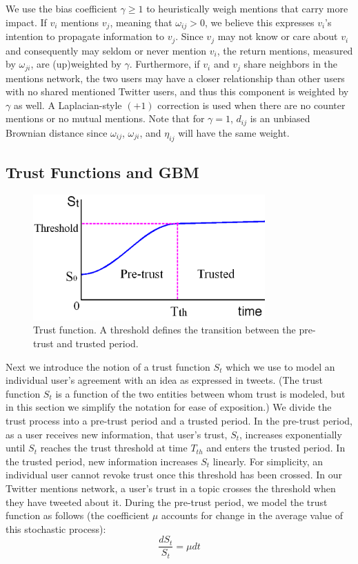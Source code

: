 We use the bias coefficient $\gamma \geq 1$ to heuristically
weigh mentions that carry more impact. If $v_i$ mentions $v_j$, meaning that $\omega_{ij} > 0$, we believe this expresses $v_i$'s intention to propagate information to $v_j$.
Since $v_j$ may not know or care about $v_i$ and consequently may seldom or never mention $v_i$, the return mentions, measured by $\omega_{ji}$, are (up)weighted by $\gamma$.
Furthermore, if $v_i$ and $v_j$ share neighbors in the mentions
network, the two users may have a closer relationship than other users
with no shared mentioned Twitter users, and thus this component
is weighted by $\gamma$ as well.
A Laplacian-style $(+1)$ correction is used
when there are no counter mentions or no mutual mentions.
Note that for $\gamma = 1$, $d_{ij}$ is an unbiased Brownian distance since $\omega_{ij}$, $\omega_{ji}$, and $\eta_{ij}$ will have the same weight. 

\subsection{Trust Functions and GBM}
\begin{figure}[ht]
\centering
\includegraphics[width=3.5in]{figures/trustFunction.png} %
\caption{Trust function. A threshold defines the transition between the
pre-trust and trusted period.}
\label{fig:subgraph}
\end{figure}

Next we introduce the notion of a
trust function $S_t$ which we use to model an individual user's agreement with an idea as expressed in tweets.
(The trust function $S_t$ is a function of the two entities between whom
trust is modeled, but in this section we simplify the notation for
ease of exposition.)
We divide the trust process into a pre-trust
period and a trusted period.
In the pre-trust period, as a user receives new information, that user's trust, $S_t$, increases exponentially until $S_t$ reaches the trust threshold at time $T_{th}$ and enters the trusted period.
In the trusted period, new information increases $S_t$ linearly. For simplicity, an individual user cannot revoke trust once this threshold has been crossed. In our Twitter mentions network, a user's trust in a topic crosses the threshold when they have tweeted about it. During the pre-trust period, we model the
trust function as follows (the coefficient $\mu$ accounts for change in the average value of this stochastic process):
\begin{equation}\frac{d S_t}{S_t} = \mu {dt}\end{equation}


